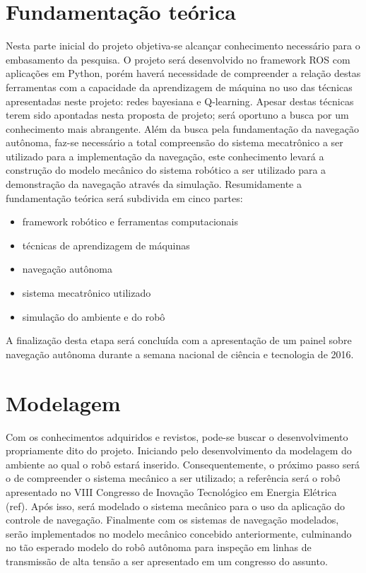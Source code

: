 \section{Fundamentação teórica}
Nesta parte inicial do projeto objetiva-se alcançar conhecimento necessário para o embasamento da pesquisa. O projeto será desenvolvido no framework ROS com aplicações em Python, porém haverá necessidade de compreender a relação destas ferramentas com a capacidade da aprendizagem de máquina no uso das técnicas apresentadas neste projeto: redes bayesiana e Q-learning. Apesar destas técnicas terem sido apontadas nesta proposta de projeto; será oportuno a busca por um conhecimento mais abrangente.
Além da busca pela fundamentação da navegação autônoma, faz-se necessário a total compreensão do sistema mecatrônico a ser utilizado para a implementação da navegação, este conhecimento levará a construção do modelo mecânico do sistema robótico a ser utilizado para a demonstração da navegação através da simulação.
Resumidamente a fundamentação teórica será subdivida em cinco partes:
\begin{itemize}
\item framework robótico e ferramentas computacionais
\item técnicas de aprendizagem de máquinas
\item navegação autônoma
\item sistema mecatrônico utilizado
\item simulação do ambiente e do robô	
\end{itemize}
A finalização desta etapa será concluída com a apresentação de um painel sobre navegação autônoma durante a semana nacional de ciência e tecnologia de 2016.

\section{Modelagem}
Com os conhecimentos adquiridos e revistos, pode-se buscar o desenvolvimento propriamente dito do projeto. Iniciando pelo desenvolvimento da modelagem do ambiente ao qual o robô estará inserido.
Consequentemente, o próximo passo será o de compreender o sistema mecânico a ser utilizado; a referência será o robô apresentado no VIII Congresso de Inovação Tecnológico em Energia Elétrica (ref). Após isso, será modelado o sistema mecânico para o uso da aplicação do controle de navegação.
Finalmente com os sistemas de navegação modelados, serão implementados no modelo mecânico concebido anteriormente, culminando no tão esperado modelo do robô autônoma para inspeção em linhas de transmissão de alta tensão a ser apresentado em um congresso do assunto.

